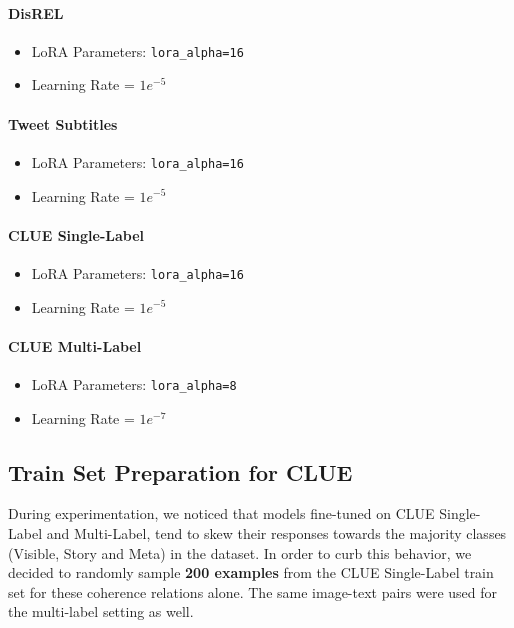 \paragraph{DisREL}
\begin{itemize}
    \item LoRA Parameters: \texttt{lora\_alpha=16}
    \item Learning Rate = $1e^{-5}$ 
\end{itemize}

\paragraph{Tweet Subtitles}
\begin{itemize}
    \item LoRA Parameters: \texttt{lora\_alpha=16}
    \item Learning Rate = $1e^{-5}$
\end{itemize}

\paragraph{CLUE Single-Label}
\begin{itemize}
    \item LoRA Parameters: \texttt{lora\_alpha=16}
    \item Learning Rate = $1e^{-5}$
\end{itemize}

\paragraph{CLUE Multi-Label}
\begin{itemize}
    \item LoRA Parameters: \texttt{lora\_alpha=8}
    \item Learning Rate = $1e^{-7}$ 
\end{itemize}

\subsection{Train Set Preparation for CLUE}
During experimentation, we noticed that models fine-tuned on CLUE Single-Label and Multi-Label, tend to skew their responses towards the majority classes (Visible, Story and Meta) in the dataset. In order to curb this behavior, we decided to randomly sample \textbf{200 examples} from the CLUE Single-Label train set for these coherence relations alone. The same image-text pairs were used for the multi-label setting as well. 

